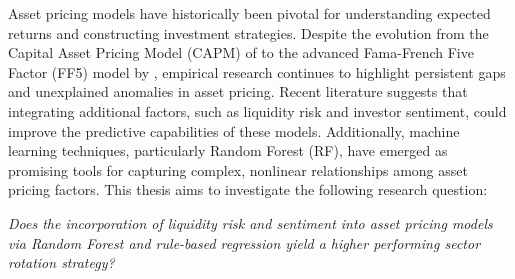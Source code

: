 Asset pricing models have historically been pivotal for understanding expected returns and constructing investment strategies. Despite the evolution from the Capital Asset Pricing Model (CAPM) of  to the advanced Fama-French Five Factor (FF5) model by , empirical research continues to highlight persistent gaps and unexplained anomalies in asset pricing. Recent literature suggests that integrating additional factors, such as liquidity risk and investor sentiment, could improve the predictive capabilities of these models. Additionally, machine learning techniques, particularly Random Forest (RF), have emerged as promising tools for capturing complex, nonlinear relationships among asset pricing factors. This thesis aims to investigate the following research question: 
\begin{center}
    \textit{Does the incorporation of liquidity risk and sentiment into asset pricing models via Random Forest and rule-based regression yield a higher performing sector rotation strategy?}
\end{center}
